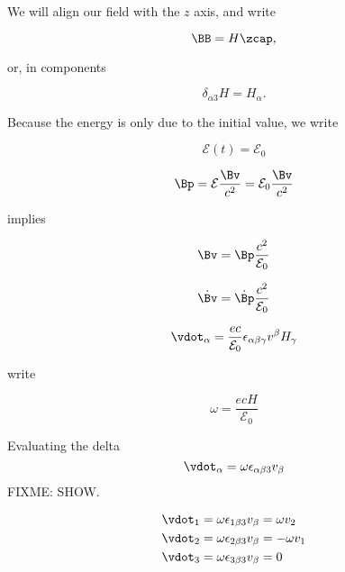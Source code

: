 We will align our field with the $z$ axis, and write

\begin{equation}\label{eqn:relativisticElectrodynamicsT3:560}
\BB = H \zcap,
\end{equation}

or, in components

\begin{equation}\label{eqn:relativisticElectrodynamicsT3:580}
\delta_{\alpha 3} H = H_\alpha.
\end{equation}

Because the energy is only due to the initial value, we write

\begin{equation}\label{eqn:relativisticElectrodynamicsT3:540}
\mathcal{E}(t) = \mathcal{E}_0
\end{equation}

\begin{equation}\label{eqn:relativisticElectrodynamicsT3:600}
\Bp = \mathcal{E} \frac{\Bv}{c^2} = \mathcal{E}_0 \frac{\Bv}{c^2}
\end{equation}

implies

\begin{equation}\label{eqn:relativisticElectrodynamicsT3:620}
\Bv = \Bp \frac{c^2}{\mathcal{E}_0}
\end{equation}

\begin{equation}\label{eqn:relativisticElectrodynamicsT3:640}
\dot{\Bv} = \dot{\Bp} \frac{c^2}{\mathcal{E}_0}
\end{equation}

\begin{equation}\label{eqn:relativisticElectrodynamicsT3:660}
\vdot_\alpha = \frac{e c}{\mathcal{E}_0} \epsilon_{\alpha \beta \gamma} v^\beta H_\gamma
\end{equation}

write

\begin{equation}\label{eqn:relativisticElectrodynamicsT3:680}
\omega = \frac{e c H}{\mathcal{E}_0}
\end{equation}

Evaluating the delta 
\begin{equation}\label{eqn:relativisticElectrodynamicsT3:700}
\vdot_\alpha = \omega \epsilon_{\alpha \beta 3} v_\beta 
\end{equation}
FIXME: SHOW.

\begin{align}\label{eqn:relativisticElectrodynamicsT3:720}
\vdot_1 &= \omega \epsilon_{1 \beta 3} v_\beta = \omega v_2 \\
\vdot_2 &= \omega \epsilon_{2 \beta 3} v_\beta = - \omega v_1 \\
\vdot_3 &= \omega \epsilon_{3 \beta 3} v_\beta = 0
\end{align}


